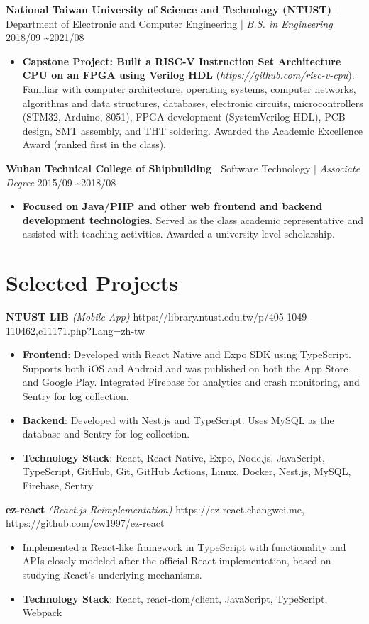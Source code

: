 \documentclass{resume}
\newcommand{\iconsection}[2]{
  \section[\texorpdfstring{#2}{#2}]{\faIcon{#1}\quad #2}
}
\begin{document}
  \datedsubsection
  {\textbf{National Taiwan University of Science and Technology (NTUST)} | Department of Electronic and Computer Engineering | \textit{B.S. in Engineering}}
  {2018/09 \textasciitilde 2021/08}
  \begin{itemize}
    \item \textbf{Capstone Project: Built a RISC-V Instruction Set Architecture CPU on an FPGA using Verilog HDL} (\textit{https://github.com/risc-v-cpu}).
    Familiar with computer architecture, operating systems, computer networks, algorithms and data structures, databases, electronic circuits, microcontrollers (STM32, Arduino, 8051), FPGA development (SystemVerilog HDL), PCB design, SMT assembly, and THT soldering. Awarded the Academic Excellence Award (ranked first in the class).
  \end{itemize}

  \datedsubsection
  {\textbf{Wuhan Technical College of Shipbuilding} | Software Technology | \textit{Associate Degree}}
  {2015/09 \textasciitilde 2018/08}
  \begin{itemize}
    \item \textbf{Focused on Java/PHP and other web frontend and backend development technologies}. Served as the class academic representative and assisted with teaching activities. Awarded a university-level scholarship.
  \end{itemize}

  \iconsection{list}{Selected Projects}

  \datedsubsection
  {\textbf{NTUST LIB}\textit{ (Mobile App)}}
  {https://library.ntust.edu.tw/p/405-1049-110462,c11171.php?Lang=zh-tw}
  \begin{itemize}
    \item \textbf{Frontend}: Developed with React Native and Expo SDK using TypeScript. Supports both iOS and Android and was published on both the App Store and Google Play. Integrated Firebase for analytics and crash monitoring, and Sentry for log collection.
    \item \textbf{Backend}: Developed with Nest.js and TypeScript. Uses MySQL as the database and Sentry for log collection.
    \item \textbf{Technology Stack}: React, React Native, Expo, Node.js, JavaScript, TypeScript, GitHub, Git, GitHub Actions, Linux, Docker, Nest.js, MySQL, Firebase, Sentry
  \end{itemize}

  \datedsubsection
  {\textbf{ez-react}\textit{ (React.js Reimplementation)}}
  {https://ez-react.changwei.me, https://github.com/cw1997/ez-react}
  \begin{itemize}
    \item Implemented a React-like framework in TypeScript with functionality and APIs closely modeled after the official React implementation, based on studying React's underlying mechanisms.
    \item \textbf{Technology Stack}: React, react-dom/client, JavaScript, TypeScript, Webpack
  \end{itemize}
\end{document}
